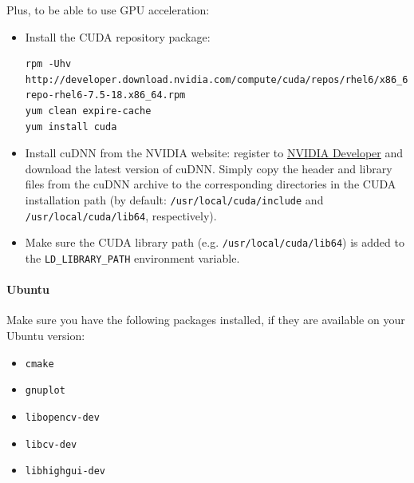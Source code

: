 \documentclass[a4paper,11pt,oneside]{article}
\newenvironment{myitemize}
{ \begin{itemize}
    \setlength{\itemsep}{0pt}
    \setlength{\parskip}{0pt}
    \setlength{\parsep}{0pt}     }
{ \end{itemize}                  }
\begin{document}
Plus, to be able to use GPU acceleration:
\begin{myitemize}
    \item Install the CUDA repository package:
\begin{lstlisting}
rpm -Uhv http://developer.download.nvidia.com/compute/cuda/repos/rhel6/x86_64/cuda-repo-rhel6-7.5-18.x86_64.rpm
yum clean expire-cache
yum install cuda
\end{lstlisting}
    \item Install cuDNN from the NVIDIA website: register to
    \href{https://developer.nvidia.com/cudnn}{NVIDIA Developer} and download
    the latest version of cuDNN.
    Simply copy the header and library files from the cuDNN archive to the
    corresponding directories in the CUDA installation path (by default:
     {\tt{}/usr/local/cuda/include} and {\tt{}/usr/local/cuda/lib64},
     respectively).
    \item Make sure the CUDA library path (e.g. {\tt{}/usr/local/cuda/lib64}) is
     added to the {\tt{}LD\_LIBRARY\_PATH} environment variable.
\end{myitemize}

\paragraph{Ubuntu}

Make sure you have the following packages installed, if they are available on
your Ubuntu version:
\begin{myitemize}
    \item \lstinline!cmake!
    \item \lstinline!gnuplot!
    \item \lstinline!libopencv-dev!
    \item \lstinline!libcv-dev!
    \item \lstinline!libhighgui-dev!
\end{myitemize}
\end{document}
